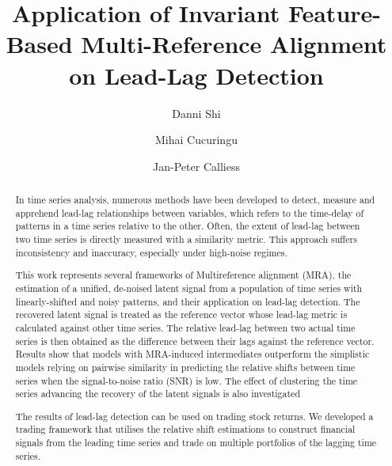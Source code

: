 \documentclass[sigconf]{acmart}
\begin{document}
\title{Application of Invariant Feature-Based Multi-Reference Alignment on Lead-Lag Detection}

\author{Danni Shi}

\author{Mihai Cucuringu}

\author{Jan-Peter Calliess}

\begin{abstract}
 In time series analysis, numerous methods have been developed to detect, measure and apprehend lead-lag relationships between variables, which refers to the time-delay of patterns in a time series relative to the other. Often, the extent of lead-lag between two time series is directly measured with a similarity metric. This approach suffers inconsistency and inaccuracy, especially under high-noise regimes. 

This work represents several frameworks of Multireference alignment (MRA), the estimation of a unified, de-noised latent signal from a population of time series with linearly-shifted and noisy patterns, and their application on lead-lag detection. The recovered latent signal is treated as the reference vector whose lead-lag metric is calculated against 
other time series. The relative lead-lag between two actual time series is then obtained as the difference between their lags against the reference vector.  Results show that models with MRA-induced intermediates outperform the simplistic models relying on pairwise similarity in predicting the relative shifts between time series when the signal-to-noise ratio (SNR) is low. The effect of clustering the time series advancing the recovery of the latent signals is also investigated

The results of lead-lag detection can be used on trading stock returns. We developed a trading framework that utilises the relative shift estimations to construct financial signals from the leading time series and trade on multiple portfolios of the lagging time series. 
\end{abstract}
\end{document}
